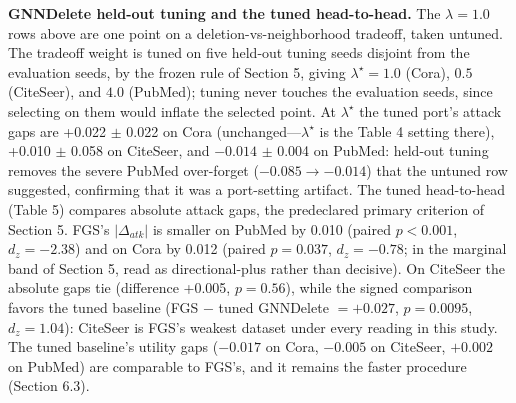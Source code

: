 \documentclass[pdflatex,sn-basic,Numbered]{sn-jnl}
\begin{document}
\begin{table}[htbp]
\end{table}

\textbf{GNNDelete held-out tuning and the tuned head-to-head.} The $\lambda = 1.0$ rows above are one point on a deletion-vs-neighborhood tradeoff, taken untuned. The tradeoff weight is tuned on five held-out tuning seeds disjoint from the evaluation seeds, by the frozen rule of Section 5, giving $\lambda^\star = 1.0$ (Cora), $0.5$ (CiteSeer), and $4.0$ (PubMed); tuning never touches the evaluation seeds, since selecting on them would inflate the selected point. At $\lambda^\star$ the tuned port's attack gaps are +0.022 $\pm$ 0.022 on Cora (unchanged---$\lambda^\star$ is the Table 4 setting there), +0.010 $\pm$ 0.058 on CiteSeer, and $-0.014$ $\pm$ 0.004 on PubMed: held-out tuning removes the severe PubMed over-forget ($-0.085 \to -0.014$) that the untuned row suggested, confirming that it was a port-setting artifact. The tuned head-to-head (Table 5) compares absolute attack gaps, the predeclared primary criterion of Section 5. FGS's $|\Delta_{atk}|$ is smaller on PubMed by 0.010 (paired $p < 0.001$, $d_z = -2.38$) and on Cora by 0.012 (paired $p = 0.037$, $d_z = -0.78$; in the marginal band of Section 5, read as directional-plus rather than decisive). On CiteSeer the absolute gaps tie (difference +0.005, $p = 0.56$), while the signed comparison favors the tuned baseline (FGS $-$ tuned GNNDelete $= +0.027$, $p = 0.0095$, $d_z = 1.04$): CiteSeer is FGS's weakest dataset under every reading in this study. The tuned baseline's utility gaps ($-0.017$ on Cora, $-0.005$ on CiteSeer, $+0.002$ on PubMed) are comparable to FGS's, and it remains the faster procedure (Section 6.3).
\end{document}
